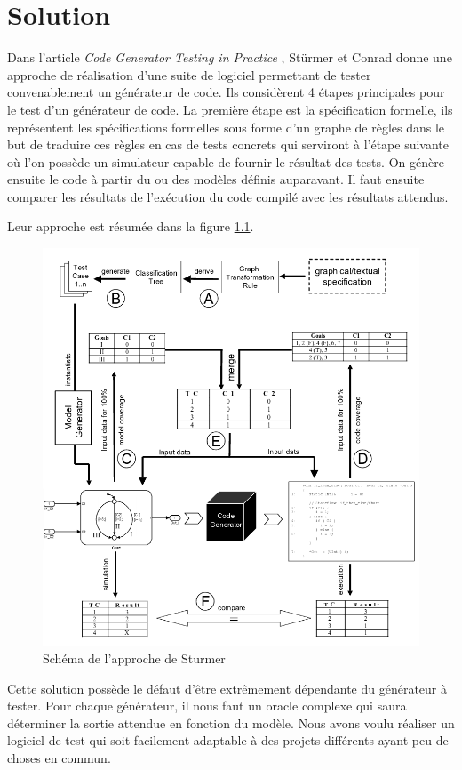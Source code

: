 \chapter{Solution}


Dans l'article \textit{Code Generator Testing in Practice} \cite{sturmer2004}, Stürmer et Conrad donne une approche de réalisation
d'une suite de logiciel permettant de tester convenablement un générateur de code.
Ils considèrent 4 étapes principales pour le test d'un générateur de code. La première étape est la spécification formelle, ils représentent les spécifications
formelles sous forme d'un graphe de règles dans le but de traduire ces règles en cas de tests concrets qui serviront à l'étape suivante où l'on possède
un simulateur capable de fournir le résultat des tests. On génère ensuite le code à partir du ou des modèles définis auparavant. Il faut ensuite
comparer les résultats de l’exécution du code compilé avec les résultats attendus.

Leur approche est résumée dans la figure \ref{codegen}.


\begin{figure}[!ht]
	\centering
	\includegraphics[width=0.7\linewidth]{images/codegen.png}
	\caption{Schéma de l'approche de Sturmer}
	\label{codegen}
\end{figure}


Cette solution possède le défaut d'être extrêmement dépendante du générateur à tester. Pour chaque générateur, il nous faut un oracle complexe
qui saura déterminer la sortie attendue en fonction du modèle. Nous avons voulu réaliser un logiciel de test qui soit facilement adaptable à des
projets différents ayant peu de choses en commun.

